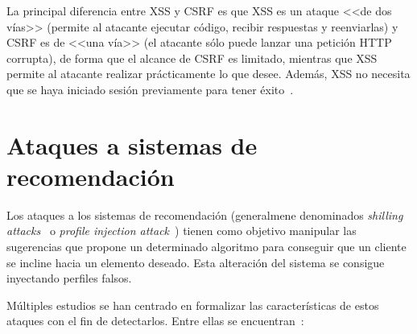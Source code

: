 La principal diferencia entre XSS y CSRF es que XSS es un ataque <<de dos vías>> (permite al atacante ejecutar código, recibir respuestas y reenviarlas) y CSRF es de <<una vía>> (el atacante sólo puede lanzar una petición HTTP corrupta), de forma que el alcance de CSRF es limitado, mientras que XSS permite al atacante realizar prácticamente lo que desee. Además, XSS no necesita que se haya iniciado sesión previamente para tener éxito~\cite{xssVsCSRF}.

\section{Ataques a sistemas de recomendación}

Los ataques a los sistemas de recomendación (generalmene denominados \textit{shilling attacks}~\cite{mingdan2018ShillingAttacksAReview} o \textit{profile injection attack}~\cite{Mobasher2006Thesis}) tienen como objetivo manipular las sugerencias que propone un determinado algoritmo para conseguir que un cliente se incline hacia un elemento deseado. Esta alteración del sistema se consigue inyectando perfiles falsos.

Múltiples estudios se han centrado en formalizar las características de estos ataques con el fin de detectarlos. Entre ellas se encuentran~\cite{mingdan2018ShillingAttacksAReview}:

